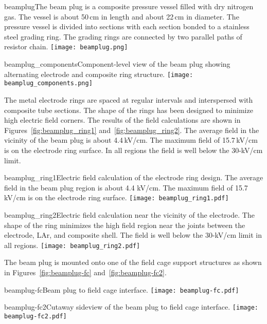 \begin{cdrfigure}{beamplug}{The beam plug is a  composite pressure vessel filled with dry nitrogen gas. The vessel is about 50\,cm in length and about 22\,cm in diameter. The pressure vessel is divided into sections with each section bonded to a stainless steel grading ring. The grading rings are connected by two parallel paths of resistor chain.}
  \texttt{[image: beamplug.png]}
\end{cdrfigure}

\begin{cdrfigure}{beamplug_components}{Component-level view of the beam plug showing alternating electrode and composite ring structure.}
  \texttt{[image: beamplug\_components.png]}
\end{cdrfigure}

The metal electrode rings are spaced at regular intervals and interspersed with composite tube sections. The shape of the rings has been designed to minimize high electric field corners. The results of the field calculations are shown in Figures~\ref{fig:beamplug_ring1} and~\ref{fig:beamplug_ring2}. The average field in the vicinity of the beam plug is about 4.4\,kV/cm. The maximum field of 15.7\,kV/cm is on the electrode ring surface. In all regions the field is well below the 30-kV/cm limit.

\begin{cdrfigure}{beamplug_ring1}{Electric field calculation of the electrode ring design. The average field in the beam plug region is about 4.4 kV/cm. The maximum field of 15.7\,kV/cm is on the electrode ring surface. }
  \texttt{[image: beamplug\_ring1.pdf]}
\end{cdrfigure}

\begin{cdrfigure}{beamplug_ring2}{Electric field calculation near the vicinity of the electrode. The shape of the ring minimizes the high field region near the joints between the electrode, LAr, and composite shell. The field is well below the 30-kV/cm limit in all regions.}
  \texttt{[image: beamplug\_ring2.pdf]}
\end{cdrfigure}

The beam plug is mounted onto one of the field cage support structures as shown in Figures~\ref{fig:beamplug-fc} and~\ref{fig:beamplug-fc2}. 
\begin{cdrfigure}{beamplug-fc}{Beam plug to field cage interface.}
\texttt{[image: beamplug-fc.pdf]}
\end{cdrfigure}
\begin{cdrfigure}{beamplug-fc2}{Cutaway sideview of the beam plug to field cage interface.}
\texttt{[image: beamplug-fc2.pdf]}
\end{cdrfigure}

